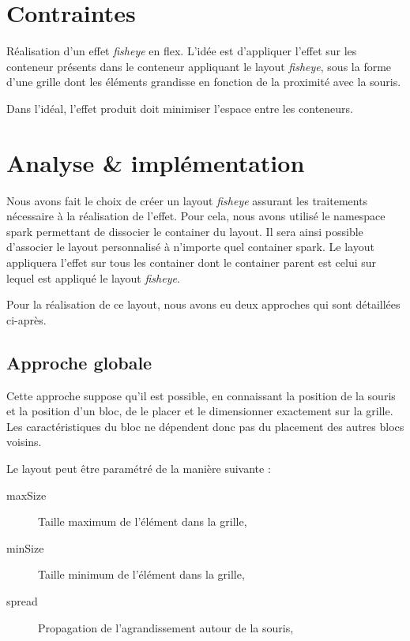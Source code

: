 \section{Contraintes}
Réalisation d'un effet \emph{fisheye} en flex. L'idée est d'appliquer l'effet sur les conteneur présents dans le conteneur appliquant le layout \emph{fisheye}, sous la forme d'une grille dont les éléments grandisse en fonction de la proximité avec la souris.

Dans l'idéal, l'effet produit doit minimiser l'espace entre les conteneurs.

\section{Analyse \& implémentation}

Nous avons fait le choix de créer un layout \emph{fisheye} assurant les traitements nécessaire à la réalisation de l'effet. Pour cela, nous avons utilisé le namespace spark permettant de dissocier le container du layout. Il sera ainsi possible d'associer le layout personnalisé à n'importe quel container spark. Le layout appliquera l'effet sur tous les container dont le container parent est celui sur lequel est appliqué le layout \emph{fisheye}.

Pour la réalisation de ce layout, nous avons eu deux approches qui sont détaillées ci-après.

\subsection{Approche globale}
Cette approche suppose qu'il est possible, en connaissant la position de la souris et la position d'un bloc, de le placer et le dimensionner exactement sur la grille. Les caractéristiques du bloc ne dépendent donc pas du placement des autres blocs voisins.

Le layout peut être paramétré de la manière suivante :

\begin{description}
  \item[maxSize] Taille maximum de l'élément dans la grille,
  \item[minSize] Taille minimum de l'élément dans la grille,
  \item[spread] Propagation de l'agrandissement autour de la souris,
\end{description}

